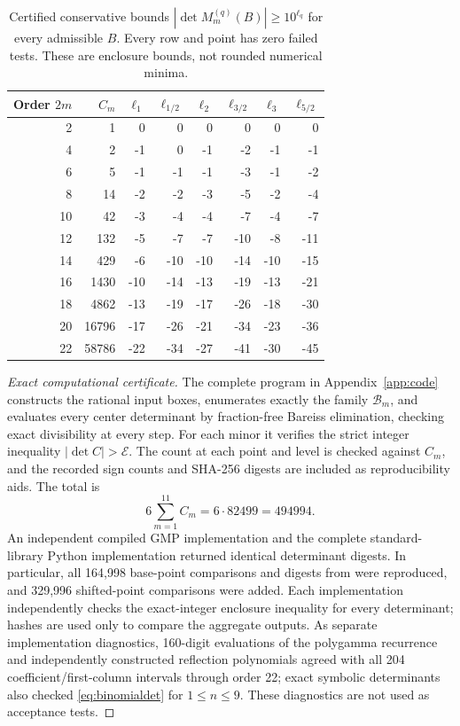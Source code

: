 \documentclass[11pt,a4paper]{article}
\theoremstyle{definition}\newtheorem{definition}[theorem]{Definition}
\theoremstyle{remark}\newtheorem{remark}[theorem]{Remark}
\begin{document}
\begin{table}[htbp]\centering\small
\begin{tabular}{rr|rrrrrr}\toprule
Order $2m$&$C_m$&$\ell_1$&$\ell_{1/2}$&$\ell_2$&$\ell_{3/2}$&$\ell_3$&$\ell_{5/2}$\\\midrule
2&1&0&0&0&0&0&0\\
4&2&-1&0&-1&-2&-1&-1\\
6&5&-1&-1&-1&-3&-1&-2\\
8&14&-2&-2&-3&-5&-2&-4\\
10&42&-3&-4&-4&-7&-4&-7\\
12&132&-5&-7&-7&-10&-8&-11\\
14&429&-6&-10&-10&-14&-10&-15\\
16&1430&-10&-14&-13&-19&-13&-21\\
18&4862&-13&-19&-17&-26&-18&-30\\
20&16796&-17&-26&-21&-34&-23&-36\\
22&58786&-22&-34&-27&-41&-30&-45\\
\bottomrule\end{tabular}
\caption{Certified conservative bounds $|\det M_m^{(q)}(B)|\ge10^{\ell_q}$ for every admissible $B$. Every row and point has zero failed tests. These are enclosure bounds, not rounded numerical minima.}\label{tab:counts}
\end{table}

\begin{proof}[Exact computational certificate]
The complete program in Appendix~\ref{app:code} constructs the rational input boxes, enumerates exactly the family $\mathcal B_m$, and evaluates every center determinant by fraction-free Bareiss elimination, checking exact divisibility at every step. For each minor it verifies the strict integer inequality $|\det C|>\mathcal E$. The count at each point and level is checked against $C_m$, and the recorded sign counts and SHA-256 digests are included as reproducibility aids. The total is
\[
6\sum_{m=1}^{11}C_m=6\cdot82499=494994.
\]
An independent compiled GMP implementation and the complete standard-library Python implementation returned identical determinant digests. In particular, all 164,998 base-point comparisons and digests from \cite{Revision} were reproduced, and 329,996 shifted-point comparisons were added. Each implementation independently checks the exact-integer enclosure inequality for every determinant; hashes are used only to compare the aggregate outputs.
As separate implementation diagnostics, 160-digit evaluations of the polygamma recurrence and independently constructed reflection polynomials agreed with all 204 coefficient/first-column intervals through order 22; exact symbolic determinants also checked \eqref{eq:binomialdet} for $1\le n\le9$. These diagnostics are not used as acceptance tests.
\end{proof}
\end{document}
